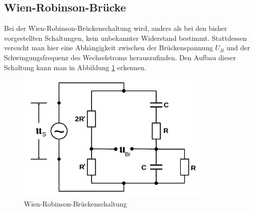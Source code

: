 \subsection{Wien-Robinson-Brücke}

Bei der Wien-Robinson-Brückenschaltung wird, anders als bei den bisher
vorgestellten Schaltungen, kein unbekannter Widerstand bestimmt.
Stattdessen versucht man hier eine Abhängigkeit zwischen der Brückenspannung
$U_B$ und der Schwingungsfrequenz \omega des Wechselstroms herauszufinden.
Den Aufbau dieser Schaltung kann man in Abbildung \ref{fig:WRBr} erkennen.

\begin{figure}[h]
  \centering
  \includegraphics[height=6.25cm]{WRBr.png}
  \caption{Wien-Robinson-Brückenschaltung}
  \label{fig:WRBr}
\end{figure}

